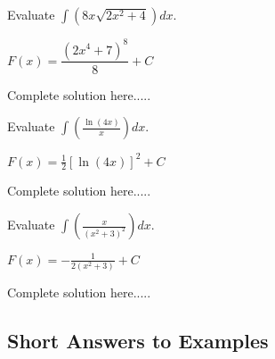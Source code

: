 \begin{example}
Evaluate $\displaystyle\int \left(8x\sqrt{2x^2+4}\right) dx$.
    \begin{sol}
    $F(x)=\dfrac{(2x^4+7)^8}{8}	+C$
    \end{sol}
    \begin{solL}
    Complete solution here.....
    
    \end{solL}
    
\end{example}
\newpage
\begin{example}
Evaluate $\displaystyle\int \left(\frac{\ln(4x)}{x}\right) dx$.
    \begin{sol}
    $F(x)=\displaystyle\frac{1}{2}[\ln(4x)]^2+C$
    \end{sol}
    \begin{solL}
    Complete solution here.....
    
    \end{solL}
    
\end{example}

\begin{example}
Evaluate $\displaystyle\int \left(\frac{x}{(x^2+3)^2}\right) dx$.
    \begin{sol}
    $F(x)=-\displaystyle\frac{1}{2(x^2+3)}+C$
    \end{sol}
    \begin{solL}
    Complete solution here.....
    
    \end{solL}
    
\end{example}




\vspace*{\fill}

\subsection*{Short Answers to Examples}



